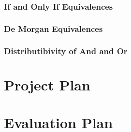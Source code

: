 \documentclass[11pt]{article}
\begin{document}
\subsubsection{If and Only If Equivalences}
\begin{enumerate}

\end{enumerate}

\subsubsection{De Morgan Equivalences}
\begin{enumerate}

\end{enumerate}

\subsubsection{Distributibivity of And and Or}
\begin{enumerate}

\end{enumerate}

\newpage

\section{Project Plan}

\newpage

\section{Evaluation Plan}

\newpage
\end{document}
